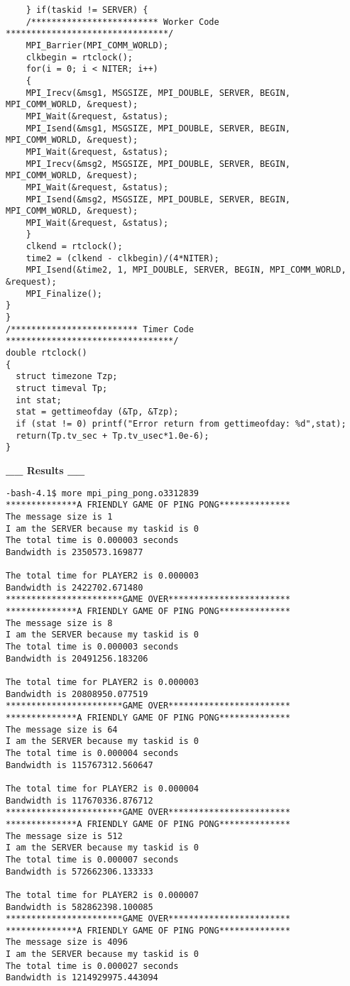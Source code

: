 \documentclass[11pt]{article}
\begin{document}
\begin{enumerate}
\begin{center}
\begin{lstlisting}
	} if(taskid != SERVER) {
	/************************* Worker Code ********************************/
	MPI_Barrier(MPI_COMM_WORLD);
	clkbegin = rtclock();
	for(i = 0; i < NITER; i++)
	{
	MPI_Irecv(&msg1, MSGSIZE, MPI_DOUBLE, SERVER, BEGIN, MPI_COMM_WORLD, &request);
	MPI_Wait(&request, &status);
	MPI_Isend(&msg1, MSGSIZE, MPI_DOUBLE, SERVER, BEGIN, MPI_COMM_WORLD, &request);
	MPI_Wait(&request, &status);
	MPI_Irecv(&msg2, MSGSIZE, MPI_DOUBLE, SERVER, BEGIN, MPI_COMM_WORLD, &request);
	MPI_Wait(&request, &status);
	MPI_Isend(&msg2, MSGSIZE, MPI_DOUBLE, SERVER, BEGIN, MPI_COMM_WORLD, &request);
	MPI_Wait(&request, &status);
	}
	clkend = rtclock();
	time2 = (clkend - clkbegin)/(4*NITER);
	MPI_Isend(&time2, 1, MPI_DOUBLE, SERVER, BEGIN, MPI_COMM_WORLD, &request);
	MPI_Finalize();
}
}
/************************* Timer Code *********************************/
double rtclock()
{
  struct timezone Tzp;
  struct timeval Tp;
  int stat;
  stat = gettimeofday (&Tp, &Tzp);
  if (stat != 0) printf("Error return from gettimeofday: %d",stat);
  return(Tp.tv_sec + Tp.tv_usec*1.0e-6);
}
\end{lstlisting}
\textbf{\_\_ Results \_\_}
\begin{lstlisting}
-bash-4.1$ more mpi_ping_pong.o3312839 
**************A FRIENDLY GAME OF PING PONG**************
The message size is 1
I am the SERVER because my taskid is 0
The total time is 0.000003 seconds
Bandwidth is 2350573.169877

The total time for PLAYER2 is 0.000003
Bandwidth is 2422702.671480
***********************GAME OVER************************
**************A FRIENDLY GAME OF PING PONG**************
The message size is 8
I am the SERVER because my taskid is 0
The total time is 0.000003 seconds
Bandwidth is 20491256.183206

The total time for PLAYER2 is 0.000003
Bandwidth is 20808950.077519
***********************GAME OVER************************
**************A FRIENDLY GAME OF PING PONG**************
The message size is 64
I am the SERVER because my taskid is 0
The total time is 0.000004 seconds
Bandwidth is 115767312.560647

The total time for PLAYER2 is 0.000004
Bandwidth is 117670336.876712
***********************GAME OVER************************
**************A FRIENDLY GAME OF PING PONG**************
The message size is 512
I am the SERVER because my taskid is 0
The total time is 0.000007 seconds
Bandwidth is 572662306.133333

The total time for PLAYER2 is 0.000007
Bandwidth is 582862398.100085
***********************GAME OVER************************
**************A FRIENDLY GAME OF PING PONG**************
The message size is 4096
I am the SERVER because my taskid is 0
The total time is 0.000027 seconds
Bandwidth is 1214929975.443094


\end{lstlisting}
\end{center}
\end{enumerate}
\end{document}
